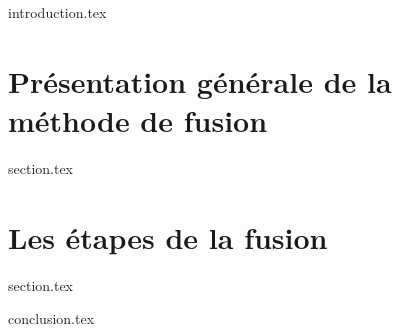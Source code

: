 %

\chaptertoc{}

\label{chap:08-int}
{introduction.tex}

\section{Présentation générale de la méthode de fusion}
\label{chap:08-sec1}
{section.tex}

\section{Les étapes de la fusion}
\label{chap:08-sec2}
{section.tex}

\label{chap:08-cnc}
{conclusion.tex}

